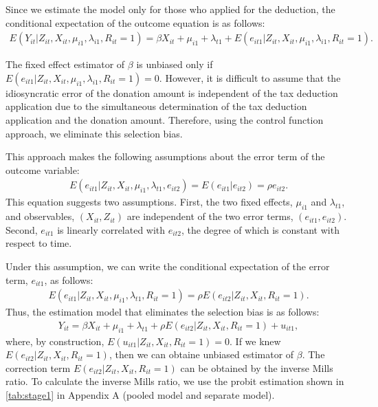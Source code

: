 \documentclass[
  11pt,
  a4paper,
]{article}
\begin{document}
Since we estimate the model only for those who applied for the deduction,
the conditional expectation of the outcome equation is as follows:
\begin{align}
  E(Y_{it} |Z_{it}, X_{it}, \mu_{i1}, \lambda_{i1}, R_{it} = 1)
  = \beta  X_{it} + \mu_{i1} + \lambda_{t1}
  + E(e_{it1} |Z_{it}, X_{it}, \mu_{i1}, \lambda_{i1}, R_{it} = 1).
\end{align}

The fixed effect estimator of \(\beta\) is unbiased only if
\(E(e_{it1} |Z_{it}, X_{it}, \mu_{i1}, \lambda_{i1}, R_{it} = 1) = 0\).
However, it is difficult to assume that
the idiosyncratic error of the donation amount
is independent of the tax deduction application
due to the simultaneous determination of
the tax deduction application and the donation amount.
Therefore, using the control function approach,
we eliminate this selection bias.

This approach makes the following assumptions
about the error term of the outcome variable:
\begin{align}
  E(e_{it1} | Z_{it}, X_{it}, \mu_{i1}, \lambda_{t1}, e_{it2})
  = E(e_{it1} | e_{it2}) = \rho e_{it2}.
\end{align}
This equation suggests two assumptions.
First, the two fixed effects, \(\mu_{i1}\) and \(\lambda_{t1}\),
and observables, \((X_{it}, Z_{it})\) are independent of
the two error terms, \((e_{it1}, e_{it2})\).
Second, \(e_{it1}\) is linearly correlated with \(e_{it2}\),
the degree of which is constant with respect to time.

Under this assumption,
we can write the conditional expectation of the error term, \(e_{it1}\),
as follows:
\begin{align}
  E(e_{it1} | Z_{it}, X_{it}, \mu_{i1}, \lambda_{t1}, R_{it} = 1)
  = \rho E(e_{it2} | Z_{it}, X_{it}, R_{it} = 1).
\end{align}
Thus, the estimation model that eliminates the selection bias is as follows:
\begin{align}
  Y_{it} = \beta  X_{it} + \mu_{i1} + \lambda_{t1}
  + \rho E(e_{it2} | Z_{it}, X_{it}, R_{it} = 1) + u_{it1},
\end{align}
where, by construction, \(E(u_{it1} | Z_{it}, X_{it}, R_{it} = 1) = 0\).
If we knew \(E(e_{it2} | Z_{it}, X_{it}, R_{it} = 1)\),
then we can obtaine unbiased estimator of \(\beta\).
The correction term \(E(e_{it2} | Z_{it}, X_{it}, R_{it} = 1)\)
can be obtained by the inverse Mills ratio.
To calculate the inverse Mills ratio, we use the probit estimation shown in
\ref{tab:stage1} in Appendix A (pooled model and separate model).
\end{document}
